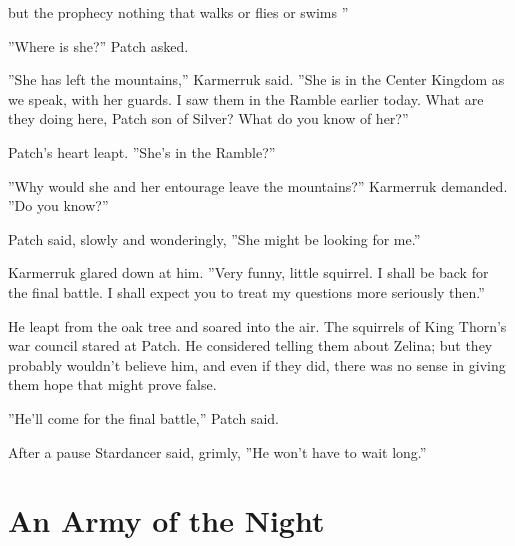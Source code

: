 \documentclass[12pt]{book}
\begin{document}
 but the prophecy %
 nothing that walks or flies or swims%
''\par
 ''Where is she?'' Patch asked.\par
 ''She has left the mountains,'' Karmerruk said. ''She is in the Center Kingdom as we speak, with her guards. I saw them in the Ramble earlier today. What are they doing here, Patch son of Silver? What do you know of her?''\par
 Patch's heart leapt. ''She's in the Ramble?''\par
 ''Why would she and her entourage leave the mountains?'' Karmerruk demanded. ''Do you know?''\par
 Patch said, slowly and wonderingly, ''She might be looking for me.''\par
 Karmerruk glared down at him. ''Very funny, little squirrel. I shall be back for the final battle. I shall expect you to treat my questions more seriously then.''\par
 He leapt from the oak tree and soared into the air. The squirrels of King Thorn's war council stared at Patch. He considered telling them about Zelina; but they probably wouldn't believe him, and even if they did, there was no sense in giving them hope that might prove false.\par
 ''He'll come for the final battle,'' Patch said.\par
 After a pause Stardancer said, grimly, ''He won't have to wait long.''\par

\section{An Army of the Night}
\end{document}
